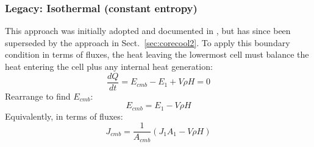 \subsubsection{Legacy: Isothermal (constant entropy)}
This approach was initially adopted and documented in \cite{BSW18}, but has since been superseded by the approach in Sect.~\ref{sec:corecool2}.  To apply this boundary condition in terms of fluxes, the heat leaving the lowermost cell must balance the heat entering the cell plus any internal heat generation:
\begin{equation}
\frac{dQ}{dt} = E_{cmb} - E_1 + V \rho H = 0
\end{equation}
Rearrange to find $E_{cmb}$:
\begin{equation}
E_{cmb} = E_1 - V \rho H
\end{equation}
Equivalently, in terms of fluxes:
\begin{equation}
J_{cmb} = \frac{1}{A_{cmb}} \left( J_1A_1 - V \rho H \right)
\end{equation}
